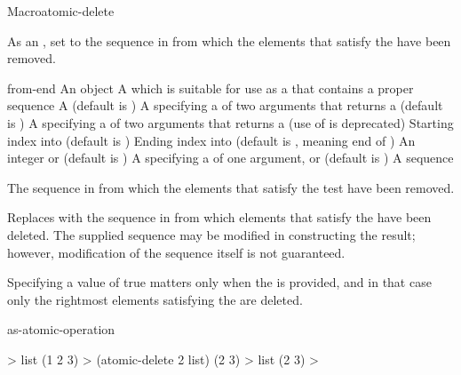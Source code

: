 \documentclass[10pt,twoside,english,pdftex]{article}
\begin{document}
\begin{functiondoc}{Macro}{atomic-delete}{
    }
%

\fnsyntax

\fnpurpose As an , set  to the
sequence in  from which the elements that satisfy the
 have been removed.

\fnpackage {}

\fnmodule {}

\fnargs
\begin{args}{from-end}
\arg[item] An object
\arg[place] A  which is suitable for use as a
 that contains a proper sequence
 A  (default is \nil)
\arg[test] A  specifying a 
of two arguments that returns a  (default is
)
 A  specifying a
 of two arguments that returns a
 (use of  is deprecated)
\arg[start] Starting index into  (default is )
\arg[end] Ending index into  (default is \nil, meaning
end of )
\arg[count] An integer or \nil{} (default is \nil)
\arg[key] A  specifying a 
of one argument, or \nil{} (default is \nil)
\arg[sequence] A sequence
\end{args}

\fnreturns The sequence in  from which the elements that
satisfy the test have been removed.

\fndescription Replaces  with the sequence in
 from which elements that satisfy the 
have been deleted.  The supplied  sequence may be modified
in constructing the result; however, modification of the sequence itself is
not guaranteed.

Specifying a  value of true matters only when
the  is provided, and in that case only the rightmost
 elements satisfying the  are deleted.

\begin{alsos}{as-atomic-operation}
\also[delq]
\end{alsos}

\fnexample
%
\W\supp
\begin{example}
  > list
  (1 2 3)
  > (atomic-delete 2 list)
  (2 3)
  > list
  (2 3)
  >
\end{example}

\end{functiondoc}
\end{document}
